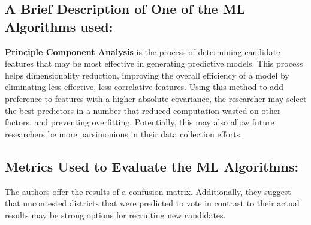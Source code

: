 \documentclass[]{article}
\begin{document}
\subsection*{A Brief Description of One of the ML Algorithms used:}
\textbf{Principle Component Analysis} is the process of determining candidate features that may be most effective in generating predictive models.
This process helps dimensionality reduction, improving the overall efficiency of a model by eliminating less effective, less correlative features.
Using this method to add preference to features with a higher absolute covariance, the researcher may select the best predictors in a number that reduced computation wasted on other factors, and preventing overfitting.
Potentially, this may also allow future researchers be more parsimonious in their data collection efforts.

\subsection*{Metrics Used to Evaluate the ML Algorithms:}
The authors offer the results of a confusion matrix. Additionally, they suggest that uncontested districts that were predicted to vote in contrast to their actual results may be strong options for recruiting new candidates.
\end{document}
